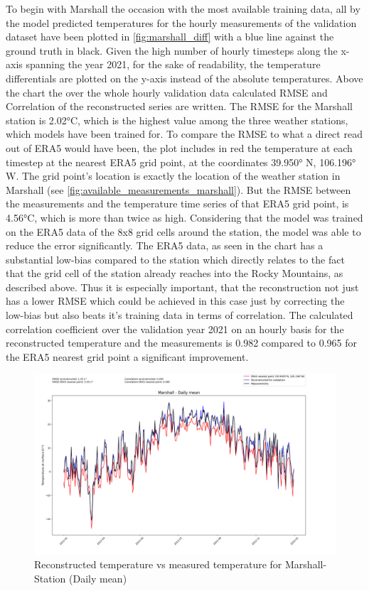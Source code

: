 To begin with Marshall the occasion with the most available training data, all by the model predicted temperatures for the hourly measurements of the validation dataset have been plotted in \autoref{fig:marshall_diff} with a blue line against the ground truth in black. Given the high number of hourly timesteps along the x-axis spanning the year 2021, for the sake of readability, the temperature differentials are plotted on the y-axis instead of the absolute temperatures. Above the chart the over the whole hourly validation data calculated RMSE and Correlation of the reconstructed series are written. The RMSE for the Marshall station is 2.02°C, which is the highest value among the three weather stations, which models have been trained for. To compare the RMSE to what a direct read out of ERA5 would have been, the plot includes in red the temperature at each timestep at the nearest ERA5 grid point, at the coordinates 39.950° N, 106.196° W. The grid point's location is exactly the location of the weather station in Marshall (see \autoref{fig:available_measurements_marshall}). But the RMSE between the measurements and the temperature time series of that ERA5 grid point, is 4.56°C, which is more than twice as high. Considering that the model was trained on the ERA5 data of the 8x8 grid cells around the station, the model was able to reduce the error significantly. The ERA5 data, as seen in the chart has a substantial low-bias compared to the station which directly relates to the fact that the grid cell of the station already reaches into the Rocky Mountains, as described above. Thus it is especially important, that the reconstruction not just has a lower RMSE which could be achieved in this case just by correcting the low-bias but also beats it's training data in terms of correlation. The calculated correlation coefficient over the validation year 2021 on an hourly basis for the reconstructed temperature and the measurements is 0.982 compared to 0.965 for the ERA5 nearest grid point a significant improvement.

\begin{figure}
    \centering
    \includegraphics[width=\textwidth]{resources/images/charts/marshall_eval_grib_final/Marshall - Daily mean.png}
    \caption{Reconstructed temperature vs measured temperature for Marshall-Station (Daily mean)}
    \label{fig:marshall_daily}
\end{figure}

